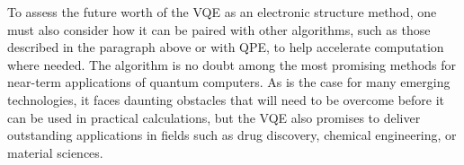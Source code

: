 \documentclass[a4paper,fleqn]{cas-sc}
\begin{document}
To assess the future worth of the VQE as an electronic structure method, one must also consider how it can be paired with other algorithms, such as those described in the paragraph above or with QPE, to help accelerate computation where needed. The algorithm is no doubt among the most promising methods for near-term applications of quantum computers. As  is the case for many emerging technologies, it faces daunting obstacles that will need to be overcome before it can be used in practical calculations, but the VQE also promises to deliver outstanding applications in fields such as drug discovery, chemical engineering, or material sciences.






\appendix

% 

\clearpage
\end{document}
